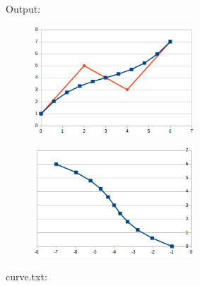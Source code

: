 \documentclass[12pt, a4paper]{article}
\begin{document}
Output:\\
\begin{scriptsize}
\begin{ttfamily}

\end{ttfamily}
\end{scriptsize}

\begin{center}
\begin{figure}[H]
\centering\includegraphics[width=6cm]{./res.png}\\
\end{figure}
\end{center}
\begin{center}
\begin{figure}[H]
\centering\includegraphics[width=6cm]{./resrot.png}\\
\end{figure}
\end{center}

curve.txt:\\
\begin{scriptsize}
\begin{ttfamily}

\end{ttfamily}
\end{scriptsize}
\end{document}
